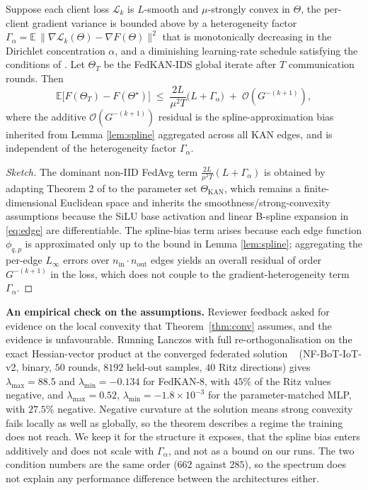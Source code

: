 \begin{theorem}\label{thm:conv}
Suppose each client loss $\mathcal{L}_k$ is $L$-smooth and $\mu$-strongly convex in $\Theta$, the per-client gradient variance is bounded above by a heterogeneity factor $\Gamma_\alpha = \mathbb{E}\,\|\nabla \mathcal{L}_k(\Theta) - \nabla F(\Theta)\|^2$ that is monotonically decreasing in the Dirichlet concentration $\alpha$, and a diminishing learning-rate schedule satisfying the conditions of \cite{li2020convergence}. Let $\Theta_T$ be the FedKAN-IDS global iterate after $T$ communication rounds. Then
\begin{equation}\label{eq:thm}
\mathbb{E}\big[F(\Theta_T) - F(\Theta^\star)\big] \;\leq\; \frac{2L}{\mu^2 T}\big(L + \Gamma_\alpha\big) \;+\; \mathcal{O}\!\left(G^{-(k+1)}\right),
\end{equation}
where the additive $\mathcal{O}(G^{-(k+1)})$ residual is the spline-approximation bias inherited from Lemma \ref{lem:spline} aggregated across all KAN edges, and is independent of the heterogeneity factor $\Gamma_\alpha$.
\end{theorem}

\begin{proof}[Sketch]
The dominant non-IID FedAvg term $\frac{2L}{\mu^2 T}(L+\Gamma_\alpha)$ is obtained by adapting Theorem 2 of \cite{li2020convergence} to the parameter set $\Theta_{\text{KAN}}$, which remains a finite-dimensional Euclidean space and inherits the smoothness/strong-convexity assumptions because the SiLU base activation and linear B-spline expansion in \eqref{eq:edge} are differentiable. The spline-bias term arises because each edge function $\phi_{q,p}$ is approximated only up to the bound in Lemma \ref{lem:spline}; aggregating the per-edge $L_\infty$ errors over $n_{\text{in}}\cdot n_{\text{out}}$ edges yields an overall residual of order $G^{-(k+1)}$ in the loss, which does not couple to the gradient-heterogeneity term $\Gamma_\alpha$.
\end{proof}

\textbf{An empirical check on the assumptions.} Reviewer feedback asked for evidence on the
local convexity that Theorem~\ref{thm:conv} assumes, and the evidence is unfavourable. Running
Lanczos with full re-orthogonalisation on the exact Hessian-vector product at the converged
federated solution ~\cite{ghorbani2019hessian,yao2020pyhessian} (NF-BoT-IoT-v2, binary, $50$ rounds, $8192$ held-out samples, $40$ Ritz
directions) gives $\lambda_{\max}=88.5$ and $\lambda_{\min}=-0.134$ for FedKAN-8, with $45\%$
of the Ritz values negative, and $\lambda_{\max}=0.52$, $\lambda_{\min}=-1.8\times 10^{-3}$
for the parameter-matched MLP, with $27.5\%$ negative. Negative curvature at the solution means
strong convexity fails locally as well as globally, so the theorem describes a regime the
training does not reach. We keep it for the structure it exposes, that the spline bias enters
additively and does not scale with $\Gamma_\alpha$, and not as a bound on our runs. The two
condition numbers are the same order ($662$ against $285$), so the spectrum does not explain
any performance difference between the architectures either.

